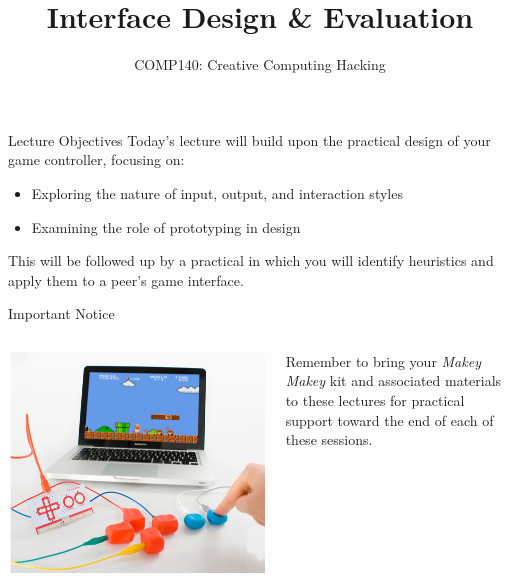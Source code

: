 \documentclass[xcolor={dvipsnames}]{beamer}\usepackage{etoolbox}\newtoggle{printable}\togglefalse{printable}
\begin{document}
\title{Interface Design \& Evaluation}   
\subtitle{COMP140: Creative Computing Hacking}

\frame{\titlepage} 

\begin{frame}{Lecture Objectives}
	Today's lecture will build upon the practical design of your game controller, focusing on:
	
	\begin{itemize}
		\item Exploring the nature of  input, output, and interaction styles
		\item Examining the role of prototyping in design
	\end{itemize}
	
	This will be followed up by a practical in which you will identify heuristics and apply them to a peer's game interface.
\end{frame}

\begin{frame}{Important Notice}
	\begin{columns}[onlytextwidth]
		\begin{column}{0.45\textwidth}
			\includegraphics[height=22ex]{MakeyMakey.jpg}
		\end{column}
		\begin{column}{0.45\textwidth}
			Remember to bring your \textit{Makey Makey} kit and associated materials to these lectures for practical 
			support toward the end of each of these sessions.
		\end{column}
	\end{columns}
\end{frame}





%

%
\end{document}
